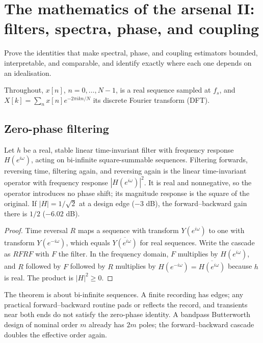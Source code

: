 \chapter[Arsenal II: spectra and phase]{The mathematics of the arsenal II: filters, spectra, phase, and coupling}\label{ch:arsenal-spectral}
\begin{readergoal}Prove the identities that make spectral, phase, and coupling estimators bounded, interpretable, and comparable, and identify exactly where each one depends on an idealisation.\end{readergoal}

Throughout, $x[n]$, $n=0,\dots,N-1$, is a real sequence sampled at $f_s$, and $X[k]=\sum_n x[n]e^{-2\pi ikn/N}$ its discrete Fourier transform (DFT).

\section{Zero-phase filtering}
\begin{theorem}\label{ars:filt-001}
Let $h$ be a real, stable linear time-invariant filter with frequency response $H(e^{i\omega})$, acting on bi-infinite square-summable sequences. Filtering forwards, reversing time, filtering again, and reversing again is the linear time-invariant operator with frequency response $|H(e^{i\omega})|^2$. It is real and nonnegative, so the operator introduces no phase shift; its magnitude response is the square of the original. If $|H|=1/\sqrt2$ at a design edge ($-3$ dB), the forward--backward gain there is $1/2$ ($-6.02$ dB).
\end{theorem}
\begin{proof}
Time reversal $R$ maps a sequence with transform $Y(e^{i\omega})$ to one with transform $Y(e^{-i\omega})$, which equals $\overline{Y(e^{i\omega})}$ for real sequences. Write the cascade as $RFRF$ with $F$ the filter. In the frequency domain, $F$ multiplies by $H(e^{i\omega})$, and $R$ followed by $F$ followed by $R$ multiplies by $H(e^{-i\omega})=\overline{H(e^{i\omega})}$ because $h$ is real. The product is $|H|^2\ge0$.
\end{proof}
\begin{remark}
The theorem is about bi-infinite sequences. A finite recording has edges; any practical forward--backward routine pads or reflects the record, and transients near both ends do not satisfy the zero-phase identity. A bandpass Butterworth design of nominal order $m$ already has $2m$ poles; the forward--backward cascade doubles the effective order again.
\end{remark}

